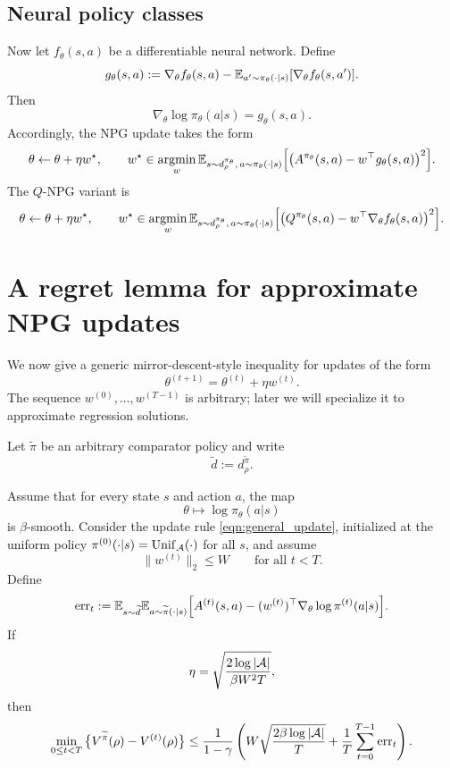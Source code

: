 \subsection{Neural policy classes}
\label{sec:neural}

Now let $f_\theta(s,a)$ be a differentiable neural network.
Define
\[
g_\theta(s,a)
:=
\nabla_\theta f_\theta(s,a)
-
\mathbb{E}_{a'\sim \pi_\theta(\cdot|s)}[\nabla_\theta f_\theta(s,a')].
\]
Then
\[
\nabla_\theta \log \pi_\theta(a|s)=g_\theta(s,a).
\]
Accordingly, the NPG update takes the form
\[
\theta \leftarrow \theta + \eta w^\star,
\qquad
w^\star \in \operatorname*{argmin}_w
\mathbb{E}_{s\sim d_\rho^{\pi_\theta},\,a\sim \pi_\theta(\cdot|s)}
\Big[
\big(A^{\pi_\theta}(s,a)-w^\top g_\theta(s,a)\big)^2
\Big].
\]
The $Q$-NPG variant is
\[
\theta \leftarrow \theta + \eta w^\star,
\qquad
w^\star \in \operatorname*{argmin}_w
\mathbb{E}_{s\sim d_\rho^{\pi_\theta},\,a\sim \pi_\theta(\cdot|s)}
\Big[
\big(Q^{\pi_\theta}(s,a)-w^\top \nabla_\theta f_\theta(s,a)\big)^2
\Big].
\]

\section{A regret lemma for approximate NPG updates}

We now give a generic mirror-descent-style inequality for updates of the form
\begin{equation}\label{eqn:general_update}
\theta^{(t+1)}=\theta^{(t)}+\eta w^{(t)}.
\end{equation}
The sequence $w^{(0)},\ldots,w^{(T-1)}$ is arbitrary; later we will specialize it to
approximate regression solutions.

Let $\widetilde \pi$ be an arbitrary comparator policy and write
\[
\widetilde d := d_\rho^{\widetilde \pi}.
\]

\begin{lemma}
\label{lemma:npg_regret}
Assume that for every state $s$ and action $a$, the map
\[
\theta \mapsto \log \pi_\theta(a|s)
\]
is $\beta$-smooth. Consider the update rule \eqref{eqn:general_update}, initialized at the
uniform policy $\pi^{(0)}(\cdot|s)=\mathrm{Unif}_{\mathcal{A}}(\cdot)$ for all $s$, and assume
\[
\|w^{(t)}\|_2 \le W
\qquad \text{for all } t<T.
\]
Define
\[
\mathrm{err}_t
:=
\mathbb{E}_{s\sim \widetilde d}
\mathbb{E}_{a\sim \widetilde \pi(\cdot|s)}
\Big[
A^{(t)}(s,a)- (w^{(t)})^\top \nabla_\theta \log \pi^{(t)}(a|s)
\Big].
\]
If
\[
\eta
=
\sqrt{\frac{2\log |\mathcal{A}|}{\beta W^2 T}},
\]
then
\[
\min_{0\le t<T}\big\{V^{\widetilde \pi}(\rho)-V^{(t)}(\rho)\big\}
\le
\frac{1}{1-\gamma}
\left(
W\sqrt{\frac{2\beta \log |\mathcal{A}|}{T}}
+
\frac{1}{T}\sum_{t=0}^{T-1}\mathrm{err}_t
\right).
\]
\end{lemma}

